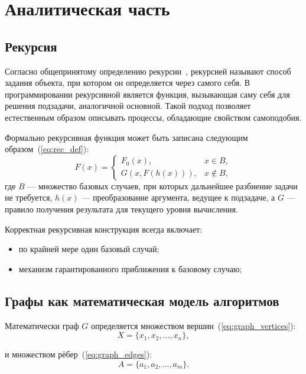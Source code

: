 \chapter{Аналитическая часть}

\section{Рекурсия}

Согласно общепринятому определению рекурсии~\cite{sweygart}, рекурсией называют способ задания объекта, при котором он определяется через самого себя. В программировании рекурсивной является функция, вызывающая саму себя для решения подзадачи, аналогичной основной. Такой подход позволяет естественным образом описывать процессы, обладающие свойством самоподобия.

Формально рекурсивная функция может быть записана следующим образом~(\ref{eq:rec_def}):
\begin{equation}
	F(x)=
	\begin{cases}
		F_0(x), & x \in B, \\[3pt]
		G\left(x, F(h(x))\right), & x \notin B,
	\end{cases}
	\label{eq:rec_def}
\end{equation}
где $B$ --- множество базовых случаев, при которых дальнейшее разбиение задачи не требуется, $h(x)$ --- преобразование аргумента, ведущее к подзадаче, а $G$ --- правило получения результата для текущего уровня вычисления.

Корректная рекурсивная конструкция всегда включает:
\begin{itemize}
	\item по крайней мере один базовый случай;
	\item механизм гарантированного приближения к базовому случаю;
\end{itemize}

\section{Графы как математическая модель алгоритмов}

Математически граф $G$ определяется множеством вершин~(\ref{eq:graph_vertices}):
\begin{equation}
	X = \{ x_1, x_2, \ldots, x_n \},
	\label{eq:graph_vertices}
\end{equation}

и множеством рёбер~(\ref{eq:graph_edges}):
\begin{equation}
	A = \{ a_1, a_2, \ldots, a_m \}.
	\label{eq:graph_edges}
\end{equation}

